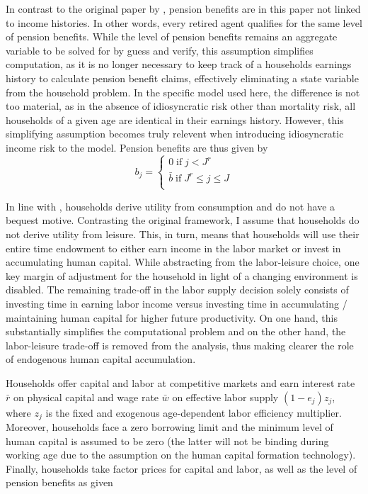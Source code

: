 In contrast to the original paper by \cite{LudwigSchelkleVogel2012}, pension benefits are in this paper not linked to income histories. In other words, every retired agent qualifies for the same level of pension benefits. While the level of pension benefits remains an aggregate variable to be solved for by guess and verify, this assumption simplifies computation, as it is no longer necessary to keep track of a households earnings history to calculate pension benefit claims, effectively eliminating a state variable from the household problem. In the specific model used here, the difference is not too material, as in the absence of idiosyncratic risk other than mortality risk, all households of a given age are identical in their earnings history. However, this simplifying assumption becomes truly relevent when introducing idiosyncratic income risk to the model. Pension benefits are thus given by
$$ b_j = \begin{cases}
				0 \;\text{if}\; j<J^r \\
                \bar{b} \;\text{if}\; J^r \leq j \leq J \\
			\end{cases} $$

In line with \citet{LudwigSchelkleVogel2012}, households derive utility from consumption and do not have a bequest motive. Contrasting the original framework, I assume that households do not derive utility from leisure. This, in turn, means that households will use their entire time endowment to either earn income in the labor market or invest in accumulating human capital. While abstracting from the labor-leisure choice, one key margin of adjustment for the household in light of a changing environment is disabled. The remaining trade-off in the labor supply decision solely consists of investing time in earning labor income versus investing time in accumulating / maintaining human capital for higher future productivity. On one hand, this substantially simplifies the computational problem and on the other hand, the labor-leisure trade-off is removed from the analysis, thus making clearer the role of endogenous human capital accumulation.

Households offer capital and labor at competitive markets and earn interest rate $\bar{r}$ on physical capital and wage rate $\bar{w}$ on effective labor supply $(1-e_j) z_j$, where $z_j$ is the fixed and exogenous age-dependent labor efficiency multiplier. Moreover, households face a zero borrowing limit and the minimum level of human capital is assumed to be zero (the latter will not be binding during working age due to the assumption on the human capital formation technology). Finally, households take factor prices for capital and labor, as well as the level of pension benefits as given

